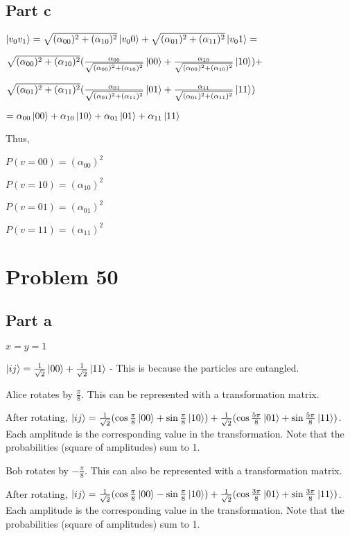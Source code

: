 \documentclass{article}
\begin{document}
\subsection{Part c}
$\ket{v_0v_1} = \sqrt{(\alpha_{00})^2 + (\alpha_{10})^2}\ket{v_00} +  \sqrt{(\alpha_{01})^2 + (\alpha_{11})^2}\ket{v_01} = $

$\sqrt{(\alpha_{00})^2 + (\alpha_{10})^2} (\frac{\alpha_{00}}{\sqrt{(\alpha_{00})^2 + (\alpha_{10})^2}}\ket{00} +  \frac{\alpha_{10}}{\sqrt{(\alpha_{00})^2 + (\alpha_{10})^2}}\ket{10}) + $

$\sqrt{(\alpha_{01})^2 + (\alpha_{11})^2} (\frac{\alpha_{01}}{\sqrt{(\alpha_{01})^2 + (\alpha_{11})^2}}\ket{01} +  \frac{\alpha_{11}}{\sqrt{(\alpha_{01})^2 + (\alpha_{11})^2}}\ket{11})$

\medskip
$= \alpha_{00}\ket{00} + \alpha_{10}\ket{10} + \alpha_{01}\ket{01} + \alpha_{11}\ket{11}$

\bigskip
\noindent Thus,

$P(v=00) = (\alpha_{00}) ^2$

$P(v=10) = (\alpha_{10}) ^2$

$P(v=01) = (\alpha_{01}) ^2$

$P(v=11) = (\alpha_{11}) ^2$

\section{Problem 50}

\subsection{Part a}

$x=y=1$

\medskip
$\ket{ij} = \frac1{\sqrt2}\ket{00} + \frac1{\sqrt2}\ket{11}$  - This is because the particles are entangled.

\medskip
Alice rotates by $\frac\pi8$.  This can be represented with a transformation matrix.

\medskip
After rotating, $\ket{ij} = \frac1{\sqrt2} ( \cos\frac\pi8 \ket{00} + \sin\frac\pi8\ket{10}) + \frac1{\sqrt2} ( \cos\frac{5\pi}8 \ket{01} + \sin\frac{5\pi}8\ket{11})$.  Each amplitude is the corresponding value in the transformation.  Note that the probabilities (square of amplitudes) sum to 1.

\medskip
Bob rotates by $-\frac\pi8$.  This can also be represented with a transformation matrix.

\medskip
After rotating, $\ket{ij} = \frac1{\sqrt2} ( \cos\frac\pi8 \ket{00} - \sin\frac\pi8\ket{10}) + \frac1{\sqrt2} ( \cos\frac{3\pi}8 \ket{01} + \sin\frac{3\pi}8\ket{11})$.  Each amplitude is the corresponding value in the transformation.  Note that the probabilities (square of amplitudes) sum to 1.
\end{document}
